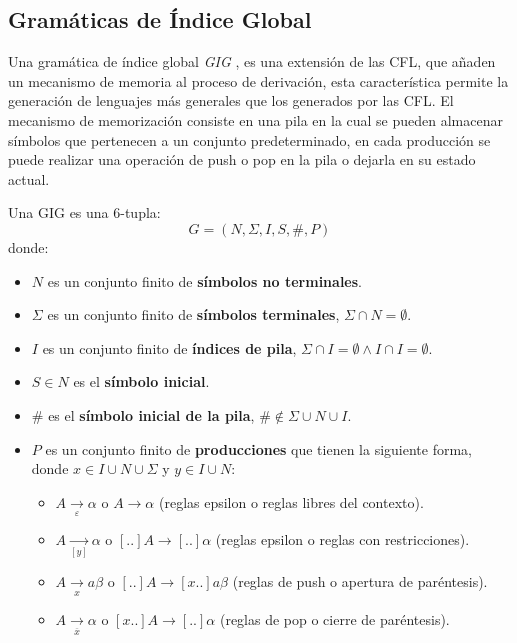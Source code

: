 \documentclass{article}
\begin{document}
\subsection{Gramáticas de Índice Global}

Una gramática de índice global \textit{GIG} \cite{globalIndexLanguages}, es una extensión de las CFL, que añaden un mecanismo 
de memoria al proceso de derivación, esta característica permite la generación de lenguajes más generales que los generados por las CFL.
El mecanismo de memorización consiste en una pila en la cual se pueden almacenar símbolos que pertenecen a un conjunto predeterminado,
en cada producción se puede realizar una operación de push o pop en la pila o dejarla en su estado actual.

Una GIG es una 6-tupla:
$$
      G = (N, \Sigma, I, S, \#, P) 
$$
donde:

\begin{itemize}
      \item $N$ es un conjunto finito de \textbf{símbolos no terminales}.
      \item \( \Sigma \) es un conjunto finito de \textbf{símbolos terminales}, $\Sigma \cap N=\emptyset$.
      \item $I$ es un conjunto finito de \textbf{índices de pila}, $\Sigma \cap I=\emptyset \wedge I \cap I=\emptyset$.
      \item $S\in N$ es el \textbf{símbolo inicial}.
      \item $\#$ es el \textbf{símbolo inicial de la pila}, $\# \notin \Sigma \cup N \cup I$.
      \item $P$ es un conjunto finito de \textbf{producciones} que tienen la siguiente forma, donde $x\in I\cup N\cup \Sigma$ y $y\in I\cup N$:
            \begin{itemize}
                  \item $A \underset{\varepsilon}{\to} \alpha$ o $A \to \alpha$ (reglas epsilon o reglas libres del contexto).
                  \item $A \underset{[y]}{\to}  \alpha$ o $[..]A \to [..]\alpha$ (reglas epsilon o reglas con restricciones).
                  \item $A \underset{x}{\to} a \beta$ o $[..]A \to  [x..]a\beta$ (reglas de push o apertura de paréntesis).
                  \item $A \underset{\overline{x}}{\to} \alpha$ o $[x..]A \to [..]\alpha$ (reglas de pop o cierre de paréntesis).
            \end{itemize}
\end{itemize}
\end{document}
